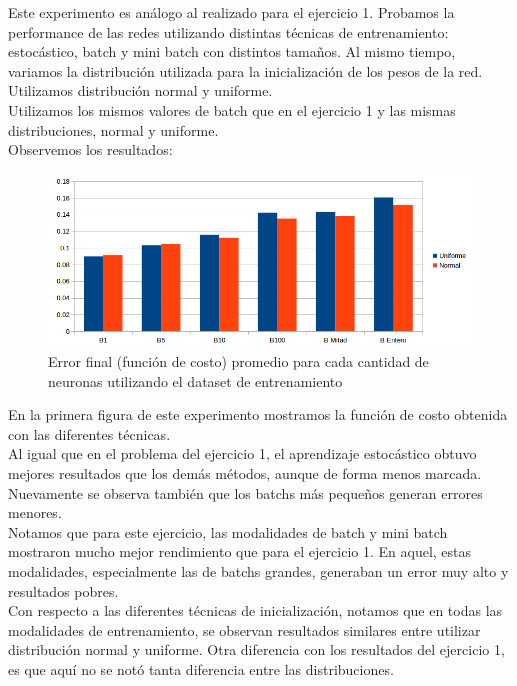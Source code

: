 Este experimento es análogo al realizado para el ejercicio 1. Probamos la performance de las redes utilizando
distintas técnicas de entrenamiento: estocástico, batch y mini batch con distintos tamaños. Al mismo tiempo, variamos 
la distribución utilizada para la inicialización de los pesos de la red. Utilizamos distribución normal y uniforme.\\

Utilizamos los mismos valores de batch que en el ejercicio 1 y las mismas distribuciones, normal y uniforme.\\
Observemos los resultados:

\begin{figure}[h]
  \begin{center}
  \includegraphics[scale=0.65]{graficos/ej2_distribucion_error_final.png}
  \caption{Error final (función de costo) promedio para cada cantidad de neuronas utilizando el dataset de entrenamiento}
  \end{center}
\end{figure}

En la primera figura de este experimento mostramos la función de costo obtenida con las diferentes técnicas.\\

Al igual que en el problema del ejercicio 1, el aprendizaje estocástico obtuvo mejores resultados que los demás métodos, aunque de forma menos marcada. Nuevamente se observa también que los batchs más pequeños generan errores menores. \\

Notamos que para este ejercicio, las modalidades de batch y mini batch mostraron mucho mejor rendimiento que para el ejercicio 1. En aquel, estas modalidades, especialmente las de batchs grandes, generaban un error muy alto y resultados pobres.\\

Con respecto a las diferentes técnicas de inicialización, notamos que en todas las modalidades de entrenamiento, se observan resultados similares entre utilizar distribución normal y uniforme. Otra diferencia con los resultados del ejercicio 1, es que aquí no se notó tanta diferencia entre las distribuciones.\\

